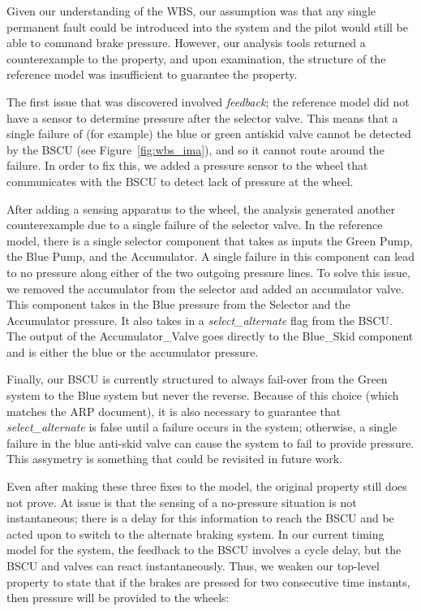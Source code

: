 Given our understanding of the WBS, our assumption was that any single permanent fault could be introduced into the system and the pilot would still be able to command brake pressure.  However, our analysis tools returned a counterexample to the property, and upon examination, the structure of the reference model was insufficient to guarantee the property.  

The first issue that was discovered involved {\em feedback}; the reference model did not have a sensor to determine pressure after the selector valve.  This means that a single failure of (for example) the blue or green antiskid valve cannot be detected by the BSCU (see Figure~\ref{fig:wbs_ima}), and so it cannot route around the failure.  In order to fix this, we added a pressure sensor to the wheel that communicates with the BSCU to detect lack of pressure at the wheel.


After adding a sensing apparatus to the wheel, the analysis generated another counterexample due to a single failure of the selector valve.  In the reference model, there is a single selector component that takes as inputs the Green Pump, the Blue Pump, and the Accumulator.  A single failure in this component can lead to no pressure along either of the two outgoing pressure lines.
To solve this issue, we removed the accumulator from the selector and added an accumulator valve.   This component takes in the Blue pressure from the Selector and the Accumulator pressure. It also takes in a \textit{select\_alternate} flag from the BSCU. The output of the Accumulator\_Valve goes directly to the Blue\_Skid component and is either the blue or the accumulator pressure.

Finally, our BSCU is currently structured to always fail-over from the Green system to the Blue system but never the reverse.  Because of this choice (which matches the ARP document), it is also necessary to guarantee that \textit{select\_alternate} is false until a failure occurs in the system; otherwise, a single failure in the blue anti-skid valve can cause the system to fail to provide pressure.  This assymetry is something that could be revisited in future work.


Even after making these three fixes to the model, the original property still does not prove.  At issue is that the sensing of a no-pressure situation is not instantaneous; there is a delay for this information to reach the BSCU and be acted upon to switch to the alternate braking system.  In our current timing model for the system, the feedback to the BSCU involves a cycle delay, but the BSCU and valves can react instantaneously.  Thus, we weaken our top-level property to state that if the brakes are pressed for two consecutive time instants, then pressure will be provided to the wheels:

